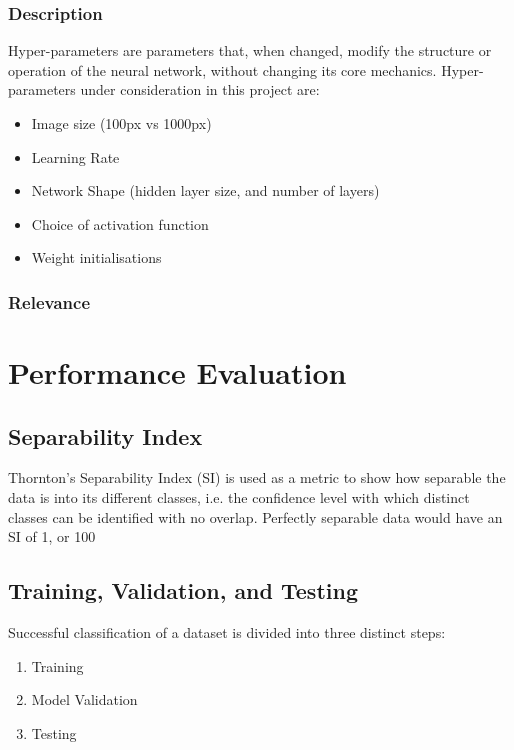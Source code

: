 \subsubsection{Description}
Hyper-parameters are parameters that, when changed, modify the structure or operation of the neural network, without changing its core mechanics. Hyper-parameters under consideration in this project are:
\begin{itemize}
	\item Image size (100px vs 1000px)
	\item Learning Rate
	\item Network Shape (hidden layer size, and number of layers)
	\item Choice of activation function
	\item Weight initialisations %
\end{itemize}
\subsubsection{Relevance}


\section{Performance Evaluation}
\subsection{Separability Index}\label{lit:SI}
Thornton's Separability Index (SI) is used as a metric to show how separable the data is into its different classes, i.e. the confidence level with which distinct classes can be identified with no overlap. Perfectly separable data would have an SI of 1, or 100%

\subsection{Training, Validation, and Testing}\label{lit:loocv}
Successful classification of a dataset is divided into three distinct steps:
\begin{enumerate}
	\item Training
	\item Model Validation
	\item Testing
\end{enumerate}

